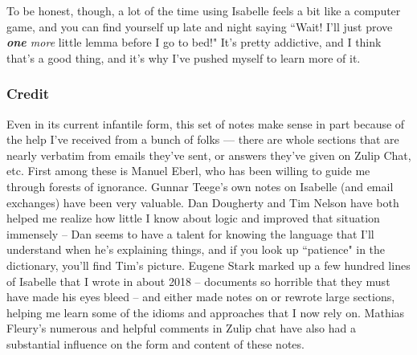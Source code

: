 To be honest, though, a lot of the time using Isabelle feels a bit like a computer game, and you can find yourself up late and night saying ``Wait! I'll just prove \textit{\textbf{one} more} little lemma before I go to bed!" It's pretty addictive, and I think that's a good thing, and it's why I've pushed myself to learn more of it.  

\subsubsection{Credit}
Even in its current infantile form, this set of notes make sense in part because of the help I've received from a bunch of folks --- there are whole sections that are nearly verbatim from emails they've sent, or answers they've given on Zulip Chat, etc. First among these is Manuel Eberl, who has been willing to guide me through forests of ignorance. Gunnar Teege's own notes on Isabelle (and email exchanges) have been very valuable. Dan Dougherty and Tim Nelson have both helped me realize how little I know about logic and improved that situation immensely -- Dan seems to have a talent for knowing the language that I'll understand when he's explaining things, and if you look up ``patience" in the dictionary, you'll find Tim's picture. Eugene Stark marked up a few hundred lines of Isabelle that I wrote in about 2018 -- documents so horrible that they must have made his eyes bleed -- and either made notes on or rewrote large sections, helping me learn some of the idioms and approaches that I now rely on. Mathias Fleury's numerous and helpful comments in Zulip chat have also had a substantial influence on the form and content of these notes. 